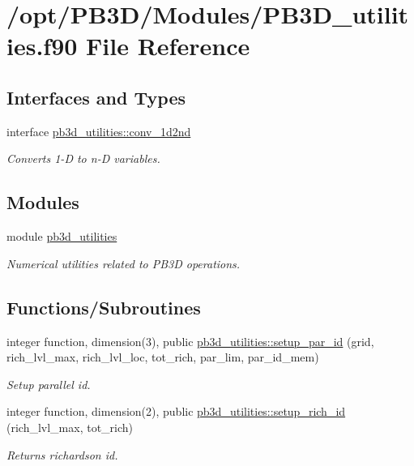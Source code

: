 \hypertarget{PB3D__utilities_8f90}{}\section{/opt/\+P\+B3\+D/\+Modules/\+P\+B3\+D\+\_\+utilities.f90 File Reference}
\label{PB3D__utilities_8f90}
\subsection*{Interfaces and Types}
\begin{DoxyCompactItemize}
\item 
interface \hyperlink{interfacepb3d__utilities_1_1conv__1d2nd}{pb3d\+\_\+utilities\+::conv\+\_\+1d2nd}
\begin{DoxyCompactList}\small\item\em Converts 1-\/D to n-\/D variables. \end{DoxyCompactList}\end{DoxyCompactItemize}
\subsection*{Modules}
\begin{DoxyCompactItemize}
\item 
module \hyperlink{namespacepb3d__utilities}{pb3d\+\_\+utilities}
\begin{DoxyCompactList}\small\item\em Numerical utilities related to P\+B3D operations. \end{DoxyCompactList}\end{DoxyCompactItemize}
\subsection*{Functions/\+Subroutines}
\begin{DoxyCompactItemize}
\item 
integer function, dimension(3), public \hyperlink{namespacepb3d__utilities_ad047cd7b197aae821e2565933faccfa3}{pb3d\+\_\+utilities\+::setup\+\_\+par\+\_\+id} (grid, rich\+\_\+lvl\+\_\+max, rich\+\_\+lvl\+\_\+loc, tot\+\_\+rich, par\+\_\+lim, par\+\_\+id\+\_\+mem)
\begin{DoxyCompactList}\small\item\em Setup parallel id. \end{DoxyCompactList}\item 
integer function, dimension(2), public \hyperlink{namespacepb3d__utilities_ab461e756a85b3c6e8fa1ccaa6556c5b0}{pb3d\+\_\+utilities\+::setup\+\_\+rich\+\_\+id} (rich\+\_\+lvl\+\_\+max, tot\+\_\+rich)
\begin{DoxyCompactList}\small\item\em Returns richardson id. \end{DoxyCompactList}\end{DoxyCompactItemize}
